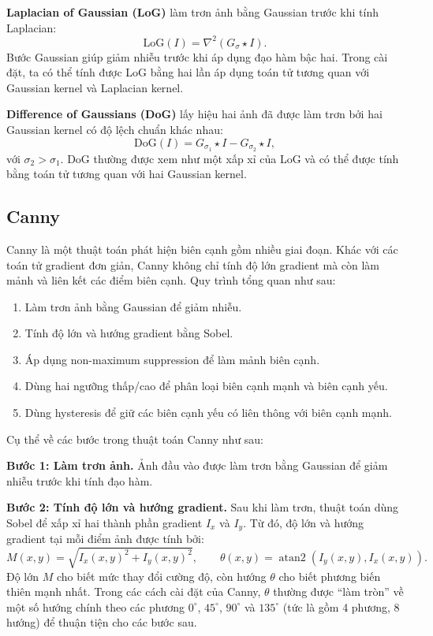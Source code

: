 \documentclass[12pt]{article}
\newcommand{\runin}[1]{\par\medskip\noindent\textbf{#1}\hspace{0.4em}\ignorespaces}
\numberwithin{equation}{section}
\begin{document}
\runin{Laplacian of Gaussian (LoG)} làm trơn ảnh bằng Gaussian trước khi tính Laplacian:
\begin{equation}
\text{LoG}(I)=\nabla^2(G_\sigma \star I).
\label{eq:log}
\end{equation}
Bước Gaussian giúp giảm nhiễu trước khi áp dụng đạo hàm bậc hai. Trong cài đặt, ta có thể tính được LoG bằng hai lần áp dụng toán tử tương quan với Gaussian kernel và Laplacian kernel.

\runin{Difference of Gaussians (DoG)} lấy hiệu hai ảnh đã được làm trơn bởi hai Gaussian kernel có độ lệch chuẩn khác nhau:
\begin{equation}
\text{DoG}(I)=G_{\sigma_1}\star I - G_{\sigma_2}\star I,
\label{eq:dog}
\end{equation}
với $\sigma_2>\sigma_1$. DoG thường được xem như một xấp xỉ của LoG và có thể được tính bằng toán tử tương quan với hai Gaussian kernel.

\subsection{Canny}

Canny là một thuật toán phát hiện biên cạnh gồm nhiều giai đoạn. Khác với các toán tử gradient đơn giản, Canny không chỉ tính độ lớn gradient mà còn làm mảnh và liên kết các điểm biên cạnh. Quy trình tổng quan như sau:
\begin{enumerate}
  \item Làm trơn ảnh bằng Gaussian để giảm nhiễu.
  \item Tính độ lớn và hướng gradient bằng Sobel.
  \item Áp dụng non-maximum suppression để làm mảnh biên cạnh.
  \item Dùng hai ngưỡng thấp/cao để phân loại biên cạnh mạnh và biên cạnh yếu.
  \item Dùng hysteresis để giữ các biên cạnh yếu có liên thông với biên cạnh mạnh.
\end{enumerate}

Cụ thể về các bước trong thuật toán Canny như sau:

\runin{Bước 1: Làm trơn ảnh.} Ảnh đầu vào được làm trơn bằng Gaussian để giảm nhiễu trước khi tính đạo hàm.

\runin{Bước 2: Tính độ lớn và hướng gradient.} Sau khi làm trơn, thuật toán dùng Sobel để xấp xỉ hai thành phần gradient $I_x$ và $I_y$. Từ đó, độ lớn và hướng gradient tại mỗi điểm ảnh được tính bởi:
\begin{equation}
M(x,y)=\sqrt{I_x(x,y)^2+I_y(x,y)^2},\qquad
\theta(x,y)=\operatorname{atan2}(I_y(x,y), I_x(x,y)).
\label{eq:canny-gradient}
\end{equation}
Độ lớn $M$ cho biết mức thay đổi cường độ, còn hướng $\theta$ cho biết phương biến thiên mạnh nhất. Trong các cách cài đặt của Canny, $\theta$ thường được ``làm tròn'' về một số hướng chính theo các phương $0^\circ$, $45^\circ$, $90^\circ$ và $135^\circ$ (tức là gồm 4 phương, 8 hướng) để thuận tiện cho các bước sau.
\end{document}

